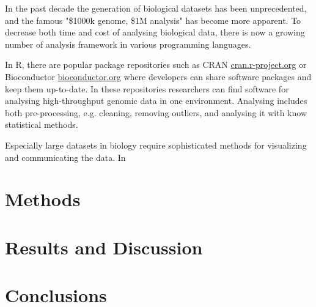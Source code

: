 

In the past decade the generation of biological datasets has been unprecedented, and the famous "\$1000k genome, \$1M analysis"\cite{} has become more apparent. To decrease both time and cost of analysing biological data, there is now a growing number of analysis framework in various programming languages. \cite{}

In R, there are popular package repositories such as CRAN \url{cran.r-project.org} or Bioconductor \url{bioconductor.org} where developers can share software packages and keep them up-to-date. In these repositories researchers can find software for analysing high-throughput genomic data in one environment. Analysing includes both pre-processing, e.g. cleaning, removing outliers, and analysing it with know statistical methods.

Especially large datasets in biology require sophisticated methods for visualizing and communicating the data. In



\section*{Methods}




\section*{Results and Discussion}



\section*{Conclusions}
